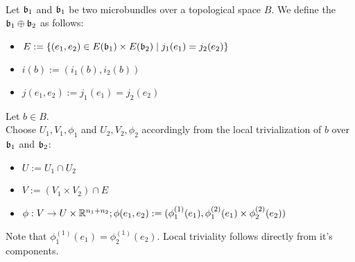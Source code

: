  \\
Let $\mathfrak{b}_1$ and $\mathfrak{b}_1$ be two microbundles over a topological space $B$.
We define the  $\mathfrak{b}_1 \oplus \mathfrak{b}_2$ as follows:
\begin{itemize}
    \item $E := \{ (e_1, e_2) \in E(\mathfrak{b}_1) \times E(\mathfrak{b}_2) \mid j_1(e_1) = j_2(e_2)\}$
    \item $i(b) := (i_1(b), i_2(b))$
    \item $j(e_1, e_2) := j_1(e_1) = j_2(e_2)$
\end{itemize}
\begin{myproof}
Let $b \in B$. \\
Choose $U_1, V_1, \phi_1$ and $U_2, V_2, \phi_2$ accordingly from the local trivialization of $b$ over $\mathfrak{b}_1$ and $\mathfrak{b}_2$:
\begin{itemize}
    \item $U := U_1 \cap U_2$
    \item $V := (V_1 \times V_2) \cap E$
    \item $\phi: V \to U \times \mathbb{R}^{n_1 + n_2}; \phi(e_1, e_2) := (\phi_1^{(1)}(e_1), \phi_1^{(2)}(e_1) \times  \phi_2^{(2)}(e_2))$
\end{itemize}
Note that $\phi_1^{(1)}(e_1) = \phi_2^{(1)}(e_2)$.
Local triviality follows directly from it's components.
\end{myproof}